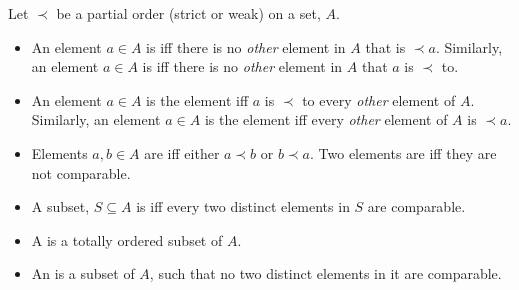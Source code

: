 \documentclass[quiz]{mcs}
\begin{document}
Let $\prec$ be a partial order (strict or weak) on a set, $A$.
\begin{itemize}

\item An element $a \in A$ is  iff there is no \emph{other}
  element in $A$ that is $\prec a$.  Similarly, an element $a \in A$ is
   iff there is no \emph{other} element in $A$ that $a$ is
  $\prec$ to.

\item An element $a \in A$ is the  element iff $a$ is
  $\prec$ to every \emph{other} element of $A$.  Similarly, an element $a
  \in A$ is the  element iff every \emph{other} element of
  $A$ is $\prec a$.

\item Elements $a,b \in A$ are  iff either $a \prec b$ or
  $b \prec a$.  Two elements are  iff they are not
  comparable.

\item A subset, $S \subseteq A$ is  iff every
two distinct elements in $S$ are comparable.

\item A  is a totally ordered subset of $A$.  

\item An  is a subset of $A$, such that no two distinct
  elements in it are comparable.

\iffalse
\item An element $a \in A$ is the \term{greatest lower bound (glb)} of a
subset, $S \subseteq A$ iff $a$ is a lower bound for $S$, and if $b \in A$
is also a lower bound for $S$, then $b \preceq a$.  Similarly for
\term{least upper bound (lub)}.
\fi

\iffalse
\item The partial order, $\prec$, is \term{well-founded} iff every
  nonempty subset of $A$ has at least one minimal element.
\fi

\end{itemize}
\end{document}

